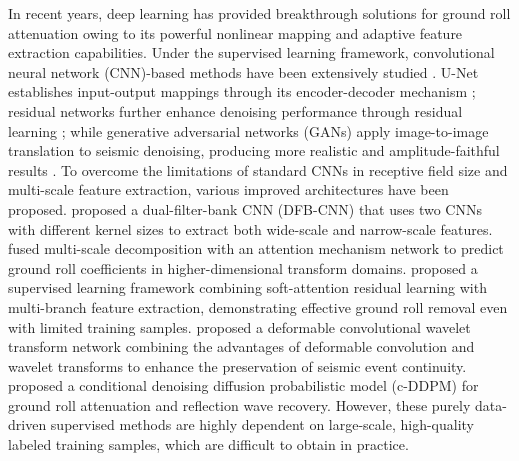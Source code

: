 \documentclass[a4paper,fleqn]{cas-dc}
\begin{document}
In recent years, deep learning has provided breakthrough solutions for ground roll 
attenuation owing to its powerful nonlinear mapping and adaptive feature extraction 
capabilities. Under the supervised learning framework, convolutional neural network 
(CNN)-based methods have been extensively studied \citep{xing2023ground}. U-Net establishes 
input-output mappings through its encoder-decoder mechanism \citep{sun2024ground}; residual 
networks further enhance denoising performance through residual learning \citep{lan2023seismic}; 
while generative adversarial networks (GANs) apply image-to-image translation to seismic 
denoising, producing more realistic and amplitude-faithful results \citep{yuan2020ground}. 
To overcome the limitations of standard CNNs in receptive field size and multi-scale feature 
extraction, various improved architectures have been proposed. \citet{zhang2022ground} 
proposed a dual-filter-bank CNN (DFB-CNN) that uses two CNNs with different kernel sizes 
to extract both wide-scale and narrow-scale features. \citet{yan2025ground} fused multi-scale 
decomposition with an attention mechanism network to predict ground roll coefficients in 
higher-dimensional transform domains. \citet{yang2023deep} proposed a supervised learning 
framework combining soft-attention residual learning with multi-branch feature extraction, 
demonstrating effective ground roll removal even with limited training samples. 
\citet{gao2024surface} proposed a deformable convolutional wavelet transform network 
combining the advantages of deformable convolution and wavelet transforms to enhance the 
preservation of seismic event continuity. \citet{li2024conditional} proposed a conditional 
denoising diffusion probabilistic model (c-DDPM) for ground roll attenuation and reflection 
wave recovery. However, these purely data-driven supervised methods are highly dependent on 
large-scale, high-quality labeled training samples, which are difficult to obtain in practice.
\end{document}
